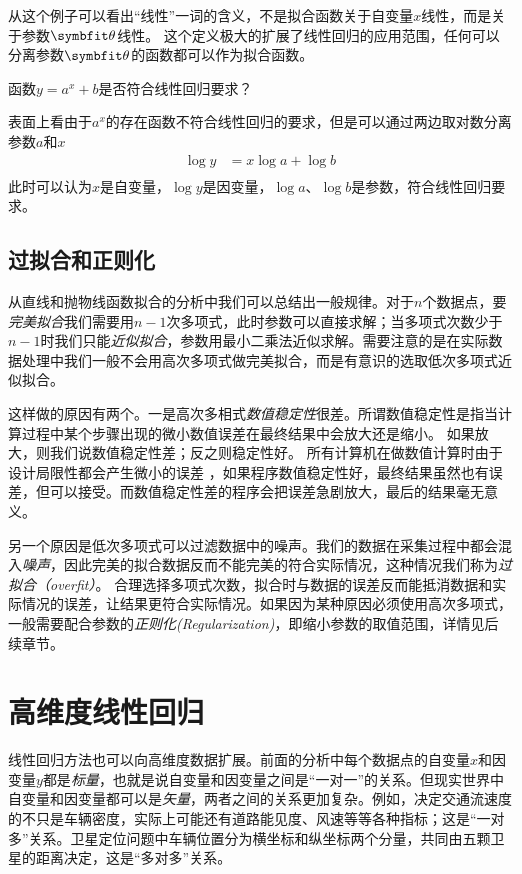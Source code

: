 从这个例子可以看出“线性”一词的含义，不是拟合函数关于自变量$x$线性，而是关于参数$\Vtheta$线性。
这个定义极大的扩展了线性回归的应用范围，任何可以分离参数$\Vtheta$的函数都可以作为拟合函数。
\begin{example}
    函数$y=a^x+b$是否符合线性回归要求？
\end{example}
\begin{solution}
    表面上看由于$a^x$的存在函数不符合线性回归的要求，但是可以通过两边取对数分离参数$a$和$x$
    \begin{align*}
        \log{y}&=x\log{a}+\log{b}\\
    \end{align*}
    此时可以认为$x$是自变量，$\log{y}$是因变量，$\log{a}$、$\log{b}$是参数，符合线性回归要求。
\end{solution}
\subsection{过拟合和正则化}

从直线和抛物线函数拟合的分析中我们可以总结出一般规律。对于$n$个数据点，要\emph{完美拟合}我们需要用$n-1$次多项式，此时参数可以直接求解；当多项式次数少于$n-1$时我们只能\emph{近似拟合}，参数用最小二乘法近似求解。需要注意的是在实际数据处理中我们一般不会用高次多项式做完美拟合，而是有意识的选取低次多项式近似拟合。

这样做的原因有两个。一是高次多相式\emph{数值稳定性}很差。所谓数值稳定性是指当计算过程中某个步骤出现的微小数值误差在最终结果中会放大还是缩小。
如果放大，则我们说数值稳定性差；反之则稳定性好。
所有计算机在做数值计算时由于设计局限性都会产生微小的误差%
，如果程序数值稳定性好，最终结果虽然也有误差，但可以接受。而数值稳定性差的程序会把误差急剧放大，最后的结果毫无意义。

另一个原因是低次多项式可以过滤数据中的噪声。我们的数据在采集过程中都会混入\emph{噪声}，因此完美的拟合数据反而不能完美的符合实际情况，这种情况我们称为\emph{过拟合（overfit）}。
合理选择多项式次数，拟合时与数据的误差反而能抵消数据和实际情况的误差，让结果更符合实际情况。如果因为某种原因必须使用高次多项式，一般需要配合参数的\emph{正则化(Regularization)}，即缩小参数的取值范围，详情见后续章节。

\section{高维度线性回归}

线性回归方法也可以向高维度数据扩展。前面的分析中每个数据点的自变量$x$和因变量$y$都是\emph{标量}，也就是说自变量和因变量之间是“一对一”的关系。但现实世界中自变量和因变量都可以是\emph{矢量}，两者之间的关系更加复杂。例如，决定交通流速度的不只是车辆密度，实际上可能还有道路能见度、风速等等各种指标；这是“一对多”关系。卫星定位问题中车辆位置分为横坐标和纵坐标两个分量，共同由五颗卫星的距离决定，这是“多对多”关系。

